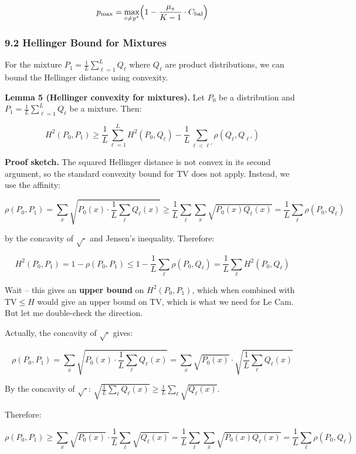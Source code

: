 \documentclass[
  12pt,
]{article}
\begin{document}
\[p_{\max} = \max_{c \neq y^*} \Bigl(1 - \frac{\mu_s}{K-1} \cdot C_{\text{bal}}\Bigr)\]

\subsubsection{9.2 Hellinger Bound for
Mixtures}\label{hellinger-bound-for-mixtures}

For the mixture \(P_1 = \frac{1}{L} \sum_{\ell=1}^L Q_\ell\) where
\(Q_\ell\) are product distributions, we can bound the Hellinger
distance using convexity.

\textbf{Lemma 5 (Hellinger convexity for mixtures).} Let \(P_0\) be a
distribution and \(P_1 = \frac{1}{L} \sum_{\ell=1}^L Q_\ell\) be a
mixture. Then:

\[H^2(P_0, P_1) \geq \frac{1}{L} \sum_{\ell=1}^L H^2(P_0, Q_\ell) - \frac{1}{L} \sum_{\ell < \ell'} \rho(Q_\ell, Q_{\ell'})\]

\textbf{Proof sketch.} The squared Hellinger distance is not convex in
its second argument, so the standard convexity bound for TV does not
apply. Instead, we use the affinity:

\[\rho(P_0, P_1) = \sum_x \sqrt{P_0(x) \cdot \frac{1}{L} \sum_{\ell} Q_\ell(x)}
\geq \frac{1}{L} \sum_{\ell} \sum_x \sqrt{P_0(x) Q_\ell(x)} = \frac{1}{L} \sum_{\ell} \rho(P_0, Q_\ell)\]

by the concavity of \(\sqrt{\cdot}\) and Jensen's inequality. Therefore:

\[H^2(P_0, P_1) = 1 - \rho(P_0, P_1) \leq 1 - \frac{1}{L} \sum_{\ell} \rho(P_0, Q_\ell)
= \frac{1}{L} \sum_{\ell} H^2(P_0, Q_\ell)\]

Wait -- this gives an \textbf{upper bound} on \(H^2(P_0, P_1)\), which
when combined with \(\text{TV} \leq H\) would give an upper bound on TV,
which is what we need for Le Cam. But let me double-check the direction.

Actually, the concavity of \(\sqrt{\cdot}\) gives:

\[\rho(P_0, P_1) = \sum_x \sqrt{P_0(x) \cdot \frac{1}{L} \sum_{\ell} Q_\ell(x)}
= \sum_x \sqrt{P_0(x)} \cdot \sqrt{\frac{1}{L} \sum_{\ell} Q_\ell(x)}\]

By the concavity of \(\sqrt{\cdot}\):
\(\sqrt{\frac{1}{L}\sum_\ell Q_\ell(x)} \geq
\frac{1}{L}\sum_\ell \sqrt{Q_\ell(x)}\).

Therefore:

\[\rho(P_0, P_1) \geq \sum_x \sqrt{P_0(x)} \cdot \frac{1}{L} \sum_{\ell} \sqrt{Q_\ell(x)}
= \frac{1}{L} \sum_{\ell} \sum_x \sqrt{P_0(x) Q_\ell(x)}
= \frac{1}{L} \sum_{\ell} \rho(P_0, Q_\ell)\]
\end{document}
